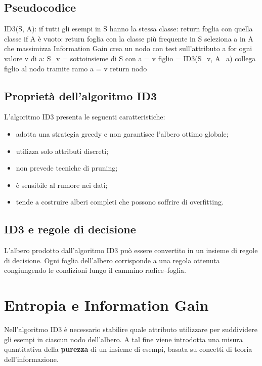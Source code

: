 \documentclass[a4paper,12pt]{report}
\begin{document}
\subsection*{Pseudocodice}

\begin{pseudocode}
ID3(S, A):
    if tutti gli esempi in S hanno la stessa classe:
        return foglia con quella classe
    if A è vuoto:
        return foglia con la classe più frequente in S
    seleziona a in A che massimizza Information Gain
    crea un nodo con test sull’attributo a
    for ogni valore v di a:
        S_v = sottoinsieme di S con a = v
        figlio = ID3(S_v, A \ {a})
        collega figlio al nodo tramite ramo a = v
    return nodo
\end{pseudocode}


\subsection{Proprietà dell’algoritmo ID3}

L’algoritmo ID3 presenta le seguenti caratteristiche:
\begin{itemize}
    \item adotta una strategia greedy e non garantisce l’albero ottimo globale;
    \item utilizza solo attributi discreti;
    \item non prevede tecniche di pruning;
    \item è sensibile al rumore nei dati;
    \item tende a costruire alberi completi che possono soffrire di overfitting.
\end{itemize}

\subsection{ID3 e regole di decisione}

L’albero prodotto dall’algoritmo ID3 può essere convertito in un insieme di regole di decisione.
Ogni foglia dell’albero corrisponde a una regola ottenuta congiungendo le condizioni lungo il cammino radice--foglia.

\section{Entropia e Information Gain}

Nell’algoritmo ID3 è necessario stabilire quale attributo utilizzare per suddividere gli esempi in ciascun nodo dell’albero.
A tal fine viene introdotta una misura quantitativa della \textbf{purezza} di un insieme di esempi, basata su concetti di teoria dell’informazione.
\end{document}
